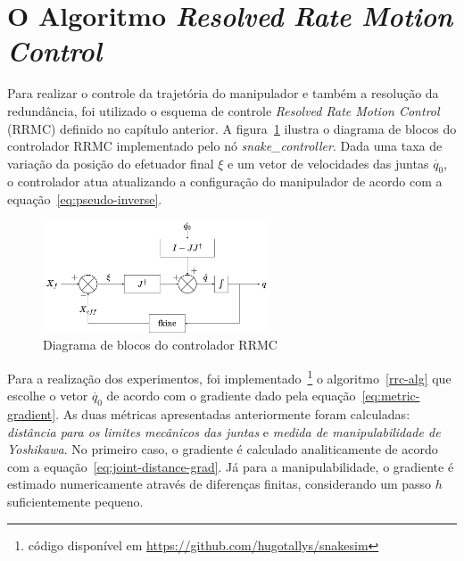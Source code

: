 \section{O Algoritmo \emph{Resolved Rate Motion Control}}

Para realizar o controle da trajetória do manipulador e também a resolução da
redundância, foi utilizado o esquema de controle \emph{Resolved Rate Motion Control} (RRMC)
definido no capítulo anterior. A figura~\ref{fig:block-diagram} ilustra o
diagrama de blocos do controlador RRMC implementado pelo nó
\emph{snake\_controller}. Dada uma taxa de variação da posição do efetuador
final \(\xi\) e um vetor de velocidades das juntas \(\dot{q_0}\), o controlador
atua atualizando a configuração do manipulador de acordo com a
equação~\ref{eq:pseudo-inverse}.

\begin{figure}
    \centering
    \includegraphics[width=0.6\textwidth]{./Images/control-scheme.png}
    \caption{Diagrama de blocos do controlador RRMC}\label{fig:block-diagram}
\end{figure}

Para a realização dos experimentos, foi implementado~\footnote{código disponível em 
\url{https://github.com/hugotallys/snakesim}}  o algoritmo~\ref{rrc-alg} que escolhe o vetor \(\dot{q_0}\)
 de acordo com o gradiente dado pela equação~\ref{eq:metric-gradient}. As duas métricas apresentadas anteriormente
foram calculadas: \emph{distância para os limites mecânicos das juntas} e
\emph{medida de manipulabilidade de Yoshikawa}. No primeiro caso, o gradiente é
calculado analiticamente de acordo com a equação~\ref{eq:joint-distance-grad}.
Já para a manipulabilidade, o gradiente é estimado numericamente através de
diferenças finitas, considerando um passo \(h\) suficientemente pequeno.

